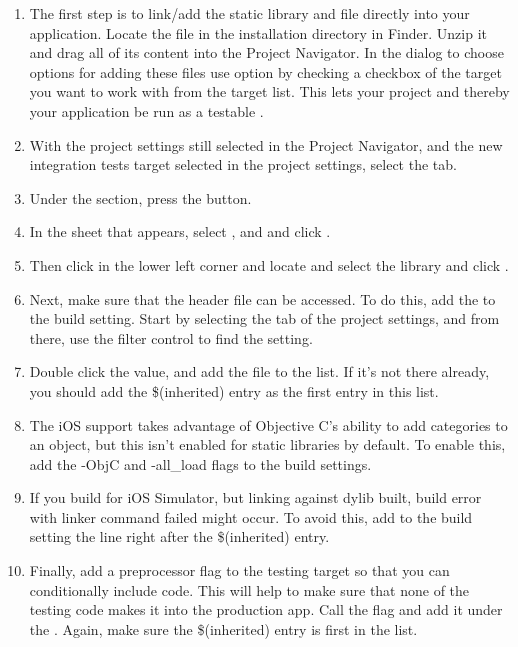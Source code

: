\begin{enumerate}
\item The first step is to link/add the  static library and  file directly into your  application. Locate the  file in the installation directory in Finder. 
Unzip it and drag all of its content into the Project Navigator. In the dialog to choose options for adding these files use  option by checking a checkbox 
of the target you want to work with from the target list.
This lets your project and thereby your  application be run as a testable \gdaut{}. 
\item With the project settings still selected in the Project Navigator, and the new integration tests target selected in the project settings, select the  tab. 
\item Under the  section, press the \bxcaption{+} button. 
\item In the sheet that appears, select ,  and  and click .
\item Then click  in the lower left corner and locate and select the library  and click .
\item Next, make sure that the   header file can be accessed. To do this, add the  to the  
build setting. Start by selecting the  tab of the project settings, and from there, use the filter control to find the 
 setting. 
\item Double click the value, and add the file  to the list. If it's not there already, you should 
add the \$(inherited) entry as the first entry in this list.
\item The iOS support takes advantage of Objective C's ability to add categories to an object, but this isn't enabled for static libraries by default. 
To enable this, add the -ObjC and -all\_load flags to the  build settings.
\item If you build for iOS Simulator, but linking against dylib built, build error with linker command failed might occur. To avoid  this, add 
to the  build setting the line  right after the \$(inherited) entry. 
\item Finally, add a preprocessor flag to the testing target so that you can conditionally include code. This will help to make sure that none of the 
testing code makes it into the production app. Call the flag  and add it under the . Again, make 
sure the \$(inherited) entry is first in the list.
\end{enumerate}

